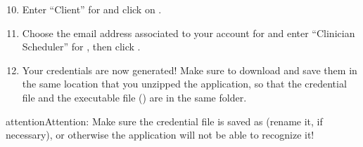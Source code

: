 \documentclass[letterpaper,10pt,english]{sphinxmanual}
\begin{document}
\begin{figure}[h!]
\centering
{}\end{figure}
\begin{enumerate}
\setcounter{enumi}{9}
\item {} 
Enter “Client” for  and click on .

\end{enumerate}

\begin{figure}[h!]
\centering
{}\end{figure}
\begin{enumerate}
\setcounter{enumi}{10}
\item {} 
Choose the email address associated to your account for 
and enter “Clinician Scheduler” for , then
click .

\end{enumerate}

\begin{figure}[h!]
\centering
{}\end{figure}
\begin{enumerate}
\setcounter{enumi}{11}
\item {} 
Your credentials are now generated! Make sure to download and save
them in the same location that you unzipped the application, so that
the credential file and the executable file () are in the same folder.

\end{enumerate}

\begin{figure}[h!]
\centering
{}\end{figure}

\begin{sphinxadmonition}{attention}{Attention:}
Make sure the credential file is saved as  (rename it, if necessary),
or otherwise the application will not be able to recognize it!
\end{sphinxadmonition}
\end{document}
